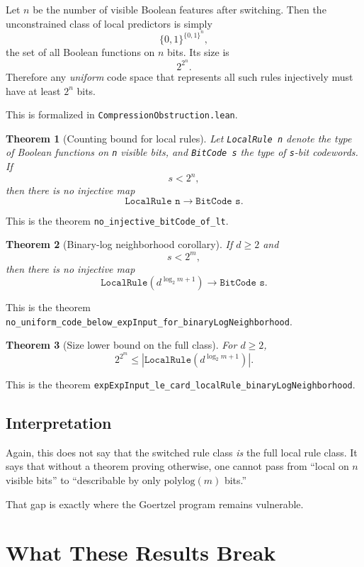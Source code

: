 \documentclass[11pt]{article}
\newtheorem{theorem}{Theorem}[section]
\theoremstyle{remark}
\begin{document}
Let $n$ be the number of visible Boolean features after switching.  Then the unconstrained class of
local predictors is simply
\[
  \{0,1\}^{\{0,1\}^n},
\]
the set of all Boolean functions on $n$ bits.  Its size is
\[
  2^{2^n}.
\]
Therefore any \emph{uniform} code space that represents all such rules injectively must have at
least $2^n$ bits.

This is formalized in \texttt{CompressionObstruction.lean}.

\begin{theorem}[Counting bound for local rules]
Let \texttt{LocalRule n} denote the type of Boolean functions on \texttt{n} visible bits, and
\texttt{BitCode s} the type of \texttt{s}-bit codewords.  If
\[
  s < 2^n,
\]
then there is no injective map
\[
  \texttt{LocalRule n} \to \texttt{BitCode s}.
\]
\end{theorem}

\noindent
This is the theorem \texttt{no\_injective\_bitCode\_of\_lt}.

\begin{theorem}[Binary-log neighborhood corollary]
If $d \ge 2$ and
\[
  s < 2^m,
\]
then there is no injective map
\[
  \texttt{LocalRule}\!\left(d^{\log_2 m + 1}\right) \to \texttt{BitCode s}.
\]
\end{theorem}

\noindent
This is the theorem
\texttt{no\_uniform\_code\_below\_expInput\_for\_binaryLogNeighborhood}.

\begin{theorem}[Size lower bound on the full class]
For $d \ge 2$,
\[
  2^{2^m} \le
  \left|\texttt{LocalRule}\!\left(d^{\log_2 m + 1}\right)\right|.
\]
\end{theorem}

\noindent
This is the theorem
\texttt{expExpInput\_le\_card\_localRule\_binaryLogNeighborhood}.

\subsection{Interpretation}

Again, this does not say that the switched rule class \emph{is} the full local rule class.  It says
that without a theorem proving otherwise, one cannot pass from
``local on $n$ visible bits'' to ``describable by only $\mathrm{polylog}(m)$ bits.''

That gap is exactly where the Goertzel program remains vulnerable.

\section{What These Results Break}
\end{document}
